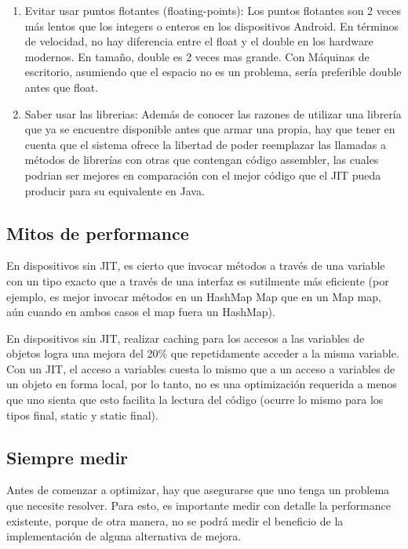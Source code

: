 \begin{enumerate}
\item Evitar usar puntos flotantes (floating-points): Los puntos flotantes son 2 veces m\'as lentos que los integers o enteros en los dispositivos Android. En t\'erminos de velocidad, no hay diferencia entre el float y el double en los hardware modernos. En tama\~no, double es 2 veces mas grande. Con M\'aquinas de escritorio, asumiendo que el espacio no es un problema, ser\'ia preferible double antes que float. 

\item Saber usar las librerias: Adem\'as de conocer las razones de utilizar una librer\'ia que ya se encuentre disponible antes que armar una propia, hay que tener en cuenta que el sistema ofrece la libertad de poder reemplazar las llamadas a m\'etodos de librer\'ias con otras que contengan c\'odigo assembler, las cuales podrian ser mejores en comparaci\'on con el mejor c\'odigo que el \ac{JIT} pueda producir para su equivalente en Java.

\end{enumerate}

\subsection{Mitos de performance}
\label{subsec:dev.perf.myths}

En dispositivos sin \ac{JIT}, es cierto que invocar m\'etodos a trav\'es de una variable con un tipo exacto que a trav\'es de una interfaz es sutilmente m\'as eficiente (por ejemplo, es mejor invocar m\'etodos en un HashMap Map que en un Map map, a\'un cuando en ambos casos el map fuera un HashMap). 

En dispositivos sin \ac{JIT}, realizar caching para los accesos a las variables de objetos logra una mejora del 20\% que repetidamente acceder a la misma variable. Con un \ac{JIT}, el acceso a variables cuesta lo mismo que a un acceso a variables de un objeto en forma local, por lo tanto, no es una optimizaci\'on requerida a menos que uno sienta que esto facilita la lectura del c\'odigo (ocurre lo mismo para los tipos final, static y static final).

\subsection{Siempre medir}
\label{subsec:dev.perf.measure.always}

Antes de comenzar a optimizar, hay que asegurarse que uno tenga un problema que necesite resolver. Para esto, es importante medir con detalle la performance existente, porque de otra manera, no se podr\'a medir el beneficio de la implementaci\'on de alguna alternativa de mejora.


